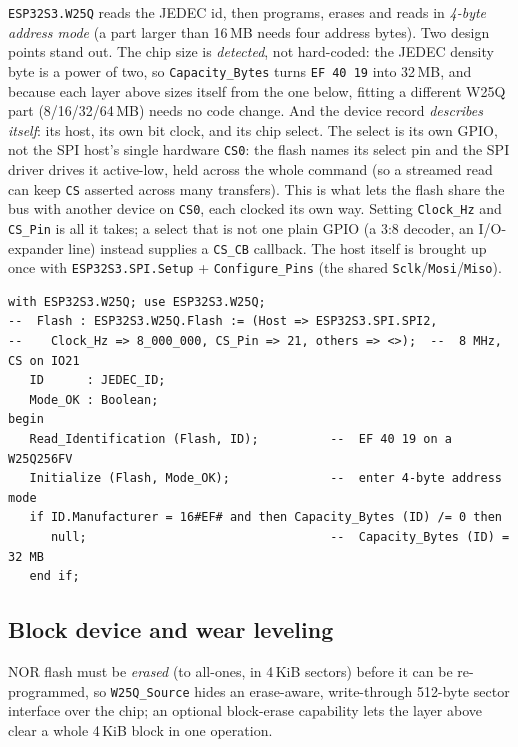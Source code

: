 \texttt{ESP32S3.W25Q} reads the JEDEC id, then programs, erases and reads in
\emph{4-byte address mode} (a part larger than 16\,MB needs four address bytes).
Two design points stand out. The chip size is \emph{detected}, not hard-coded: the
JEDEC density byte is a power of two, so \texttt{Capacity\_Bytes} turns
\texttt{EF\,40\,19} into 32\,MB, and because each layer above sizes itself from the
one below, fitting a different W25Q part (8/16/32/64\,MB) needs no code change.
And the device record \emph{describes itself}: its host, its own bit clock, and its
chip select. The select is its own GPIO, not the SPI host's single hardware
\texttt{CS0}: the flash names its select pin and the SPI driver drives it
active-low, held across the whole command (so a streamed read can keep \texttt{CS}
asserted across many transfers). This is what lets the flash share the bus
with another device on \texttt{CS0}, each clocked its own way. Setting
\texttt{Clock\_Hz} and \texttt{CS\_Pin} is all it takes; a select that is not one
plain GPIO (a 3:8 decoder, an I/O-expander line) instead supplies a \texttt{CS\_CB}
callback. The host itself is brought up once with \texttt{ESP32S3.SPI.Setup} +
\texttt{Configure\_Pins} (the shared \texttt{Sclk}/\texttt{Mosi}/\texttt{Miso}).

\begin{lstlisting}
with ESP32S3.W25Q; use ESP32S3.W25Q;
--  Flash : ESP32S3.W25Q.Flash := (Host => ESP32S3.SPI.SPI2,
--    Clock_Hz => 8_000_000, CS_Pin => 21, others => <>);  --  8 MHz, CS on IO21
   ID      : JEDEC_ID;
   Mode_OK : Boolean;
begin
   Read_Identification (Flash, ID);          --  EF 40 19 on a W25Q256FV
   Initialize (Flash, Mode_OK);              --  enter 4-byte address mode
   if ID.Manufacturer = 16#EF# and then Capacity_Bytes (ID) /= 0 then
      null;                                  --  Capacity_Bytes (ID) = 32 MB
   end if;
\end{lstlisting}

\subsection{Block device and wear leveling}

NOR flash must be \emph{erased} (to all-ones, in 4\,KiB sectors) before it can be
re-programmed, so \texttt{W25Q\_Source} hides an erase-aware, write-through
512-byte sector interface over the chip; an optional block-erase capability lets
the layer above clear a whole 4\,KiB block in one operation.

